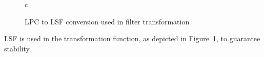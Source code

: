 \begin{figure}[htbp]
	\centering
	\begin{tabular}[h]{c}
	\end{tabular}
	\caption{LPC to LSF conversion used in filter transformation}
	\label{fig:lpc_to_lsf}
\end{figure}
LSF is used in the transformation function, as depicted in Figure~\ref{fig:lpc_to_lsf}, to guarantee stability.


% 
% 
% 
